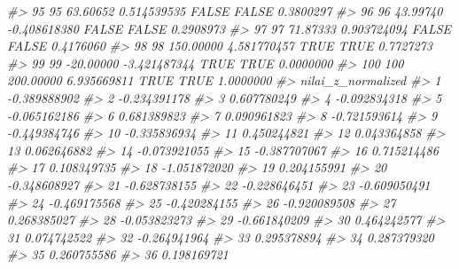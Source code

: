 \documentclass[
  oneside]{book}
\newenvironment{Shaded}{\begin{snugshade}}{\end{snugshade}}
\newcommand{\CommentTok}[1]{\textcolor[rgb]{0.56,0.35,0.01}{\textit{#1}}}
\begin{document}
\begin{Shaded}
\begin{Highlighting}[]
\CommentTok{\#\textgreater{} 95   95  63.60652  0.514539535     FALSE       FALSE        0.3800297}
\CommentTok{\#\textgreater{} 96   96  43.99740 {-}0.408618380     FALSE       FALSE        0.2908973}
\CommentTok{\#\textgreater{} 97   97  71.87333  0.903724094     FALSE       FALSE        0.4176060}
\CommentTok{\#\textgreater{} 98   98 150.00000  4.581770457      TRUE        TRUE        0.7727273}
\CommentTok{\#\textgreater{} 99   99 {-}20.00000 {-}3.421487344      TRUE        TRUE        0.0000000}
\CommentTok{\#\textgreater{} 100 100 200.00000  6.935669811      TRUE        TRUE        1.0000000}
\CommentTok{\#\textgreater{}     nilai\_z\_normalized}
\CommentTok{\#\textgreater{} 1         {-}0.389888902}
\CommentTok{\#\textgreater{} 2         {-}0.234391178}
\CommentTok{\#\textgreater{} 3          0.607780249}
\CommentTok{\#\textgreater{} 4         {-}0.092834318}
\CommentTok{\#\textgreater{} 5         {-}0.065162186}
\CommentTok{\#\textgreater{} 6          0.681389823}
\CommentTok{\#\textgreater{} 7          0.090961823}
\CommentTok{\#\textgreater{} 8         {-}0.721593614}
\CommentTok{\#\textgreater{} 9         {-}0.449384746}
\CommentTok{\#\textgreater{} 10        {-}0.335836934}
\CommentTok{\#\textgreater{} 11         0.450244821}
\CommentTok{\#\textgreater{} 12         0.043364858}
\CommentTok{\#\textgreater{} 13         0.062646882}
\CommentTok{\#\textgreater{} 14        {-}0.073921055}
\CommentTok{\#\textgreater{} 15        {-}0.387707067}
\CommentTok{\#\textgreater{} 16         0.715214486}
\CommentTok{\#\textgreater{} 17         0.108349735}
\CommentTok{\#\textgreater{} 18        {-}1.051872020}
\CommentTok{\#\textgreater{} 19         0.204155991}
\CommentTok{\#\textgreater{} 20        {-}0.348608927}
\CommentTok{\#\textgreater{} 21        {-}0.628738155}
\CommentTok{\#\textgreater{} 22        {-}0.228646451}
\CommentTok{\#\textgreater{} 23        {-}0.609050491}
\CommentTok{\#\textgreater{} 24        {-}0.469175568}
\CommentTok{\#\textgreater{} 25        {-}0.420284155}
\CommentTok{\#\textgreater{} 26        {-}0.920089508}
\CommentTok{\#\textgreater{} 27         0.268385027}
\CommentTok{\#\textgreater{} 28        {-}0.053823273}
\CommentTok{\#\textgreater{} 29        {-}0.661840209}
\CommentTok{\#\textgreater{} 30         0.464242577}
\CommentTok{\#\textgreater{} 31         0.074742522}
\CommentTok{\#\textgreater{} 32        {-}0.264941964}
\CommentTok{\#\textgreater{} 33         0.295378894}
\CommentTok{\#\textgreater{} 34         0.287379320}
\CommentTok{\#\textgreater{} 35         0.260755586}
\CommentTok{\#\textgreater{} 36         0.198169721}

\end{Highlighting}
\end{Shaded}
\end{document}
